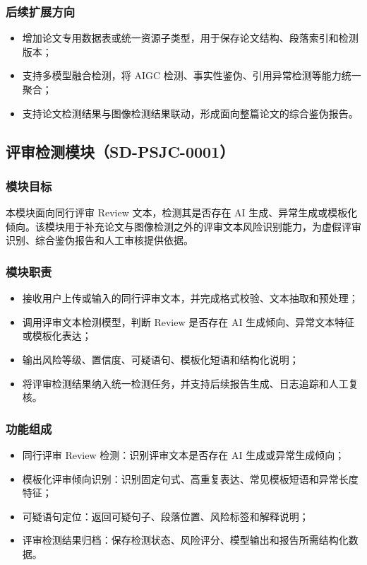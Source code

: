 \subsubsection{后续扩展方向}
\begin{itemize}[leftmargin=2em]
    \item 增加论文专用数据表或统一资源子类型，用于保存论文结构、段落索引和检测版本；
    \item 支持多模型融合检测，将 AIGC 检测、事实性鉴伪、引用异常检测等能力统一聚合；
    \item 支持论文检测结果与图像检测结果联动，形成面向整篇论文的综合鉴伪报告。
\end{itemize}

\subsection{评审检测模块（SD-PSJC-0001）}

\subsubsection{模块目标}
本模块面向同行评审 Review 文本，检测其是否存在 AI 生成、异常生成或模板化倾向。该模块用于补充论文与图像检测之外的评审文本风险识别能力，为虚假评审识别、综合鉴伪报告和人工审核提供依据。

\subsubsection{模块职责}
\begin{itemize}[leftmargin=2em]
    \item 接收用户上传或输入的同行评审文本，并完成格式校验、文本抽取和预处理；
    \item 调用评审文本检测模型，判断 Review 是否存在 AI 生成倾向、异常文本特征或模板化表达；
    \item 输出风险等级、置信度、可疑语句、模板化短语和结构化说明；
    \item 将评审检测结果纳入统一检测任务，并支持后续报告生成、日志追踪和人工复核。
\end{itemize}

\subsubsection{功能组成}
\begin{itemize}[leftmargin=2em]
    \item 同行评审 Review 检测：识别评审文本是否存在 AI 生成或异常生成倾向；
    \item 模板化评审倾向识别：识别固定句式、高重复表达、常见模板短语和异常长度特征；
    \item 可疑语句定位：返回可疑句子、段落位置、风险标签和解释说明；
    \item 评审检测结果归档：保存检测状态、风险评分、模型输出和报告所需结构化数据。
\end{itemize}

